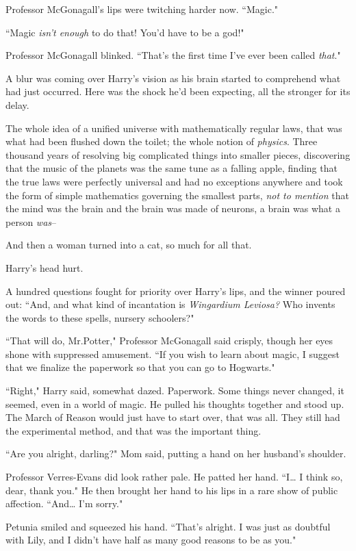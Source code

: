 Professor McGonagall's lips were twitching harder now. ``Magic."

``Magic \emph{isn't enough} to do that! You'd have to be a god!"

Professor McGonagall blinked. ``That's the first time I've ever been called \emph{that}."

A blur was coming over Harry's vision as his brain started to comprehend what had just occurred. Here was the shock he'd been expecting, all the stronger for its delay.

The whole idea of a unified universe with mathematically regular laws, that was what had been flushed down the toilet; the whole notion of \emph{physics}. Three thousand years of resolving big complicated things into smaller pieces, discovering that the music of the planets was the same tune as a falling apple, finding that the true laws were perfectly universal and had no exceptions anywhere and took the form of simple mathematics governing the smallest parts, \emph{not to mention} that the mind was the brain and the brain was made of neurons, a brain was what a person \emph{was}\---

And then a woman turned into a cat, so much for all that.

Harry's head hurt.

A hundred questions fought for priority over Harry's lips, and the winner poured out: ``And, and what kind of incantation is \emph{Wingardium Leviosa?} Who invents the words to these spells, nursery schoolers?"

``That will do, Mr.\?Potter," Professor McGonagall said crisply, though her eyes shone with suppressed amusement. ``If you wish to learn about magic, I suggest that we finalize the paperwork so that you can go to Hogwarts."

``Right," Harry said, somewhat dazed. Paperwork. Some things never changed, it seemed, even in a world of magic. He pulled his thoughts together and stood up. The March of Reason would just have to start over, that was all. They still had the experimental method, and that was the important thing.

``Are you alright, darling?" Mom said, putting a hand on her husband's shoulder.

Professor Verres-Evans did look rather pale. He patted her hand. ``I{\ldots} I think so, dear, thank you." He then brought her hand to his lips in a rare show of public affection. ``And{\ldots} I'm sorry."

Petunia smiled and squeezed his hand. ``That's alright. I was just as doubtful with Lily, and I didn't have half as many good reasons to be as you."

